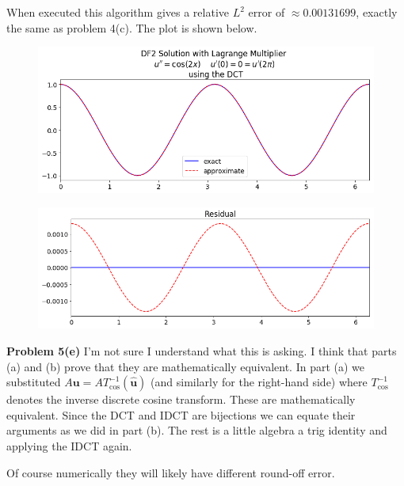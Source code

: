 \documentclass[12pt]{article}
\newcommand{\problem}[1]{\hspace{-4 ex} \large \textbf{Problem #1} }
\renewcommand{\vec}[1]{\boldsymbol{\mathbf{#1}}}
\begin{document}
When executed this algorithm gives a relative $L^2$ error of $\approx 0.00131699$, exactly the same as problem 4(c). The plot is shown below.

\begin{figure}[H]
	\includegraphics[width=1\textwidth]{hw03_p5d}
	\centering
\end{figure}
\begin{figure}[H]
	\includegraphics[width=1\textwidth]{hw03_p5d_residual}
	\centering
\end{figure}

\bigbreak
\problem{5(e)} I'm not sure I understand what this is asking. I think that parts (a) and (b) prove that they are mathematically equivalent. In part (a) we substituted $A\vec{u} = A T_{\cos}^{-1}(\hat{\vec{u}})$ (and similarly for the right-hand side) where $T_{\cos}^{-1}$ denotes the inverse discrete cosine transform. These are mathematically equivalent. Since the DCT and IDCT are bijections we can equate their arguments as we did in part (b). The rest is a little algebra a trig identity and applying the IDCT again. \bigbreak

Of course numerically they will likely have different round-off error.
\end{document}
